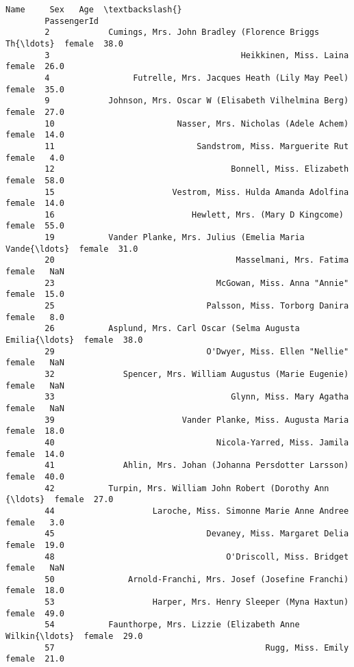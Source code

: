 \documentclass[11pt]{article}
\begin{document}
\begin{Verbatim}[commandchars=\\\{\}]
                                                                  Name     Sex   Age  \textbackslash{}
        PassengerId                                                                    
        2            Cumings, Mrs. John Bradley (Florence Briggs Th{\ldots}  female  38.0   
        3                                       Heikkinen, Miss. Laina  female  26.0   
        4                 Futrelle, Mrs. Jacques Heath (Lily May Peel)  female  35.0   
        9            Johnson, Mrs. Oscar W (Elisabeth Vilhelmina Berg)  female  27.0   
        10                         Nasser, Mrs. Nicholas (Adele Achem)  female  14.0   
        11                             Sandstrom, Miss. Marguerite Rut  female   4.0   
        12                                    Bonnell, Miss. Elizabeth  female  58.0   
        15                        Vestrom, Miss. Hulda Amanda Adolfina  female  14.0   
        16                            Hewlett, Mrs. (Mary D Kingcome)   female  55.0   
        19           Vander Planke, Mrs. Julius (Emelia Maria Vande{\ldots}  female  31.0   
        20                                     Masselmani, Mrs. Fatima  female   NaN   
        23                                 McGowan, Miss. Anna "Annie"  female  15.0   
        25                               Palsson, Miss. Torborg Danira  female   8.0   
        26           Asplund, Mrs. Carl Oscar (Selma Augusta Emilia{\ldots}  female  38.0   
        29                               O'Dwyer, Miss. Ellen "Nellie"  female   NaN   
        32              Spencer, Mrs. William Augustus (Marie Eugenie)  female   NaN   
        33                                    Glynn, Miss. Mary Agatha  female   NaN   
        39                          Vander Planke, Miss. Augusta Maria  female  18.0   
        40                                 Nicola-Yarred, Miss. Jamila  female  14.0   
        41              Ahlin, Mrs. Johan (Johanna Persdotter Larsson)  female  40.0   
        42           Turpin, Mrs. William John Robert (Dorothy Ann {\ldots}  female  27.0   
        44                    Laroche, Miss. Simonne Marie Anne Andree  female   3.0   
        45                               Devaney, Miss. Margaret Delia  female  19.0   
        48                                   O'Driscoll, Miss. Bridget  female   NaN   
        50               Arnold-Franchi, Mrs. Josef (Josefine Franchi)  female  18.0   
        53                    Harper, Mrs. Henry Sleeper (Myna Haxtun)  female  49.0   
        54           Faunthorpe, Mrs. Lizzie (Elizabeth Anne Wilkin{\ldots}  female  29.0   
        57                                           Rugg, Miss. Emily  female  21.0   

\end{Verbatim}
\end{document}
